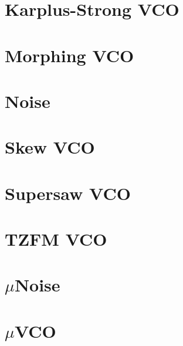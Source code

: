 \documentclass[11pt]{book}
\begin{document}
\section{Karplus-Strong VCO}
\pagebreak
\section{Morphing VCO}
\pagebreak
\section{Noise}
\pagebreak
\section{Skew VCO}
\pagebreak
\section{Supersaw VCO}
\pagebreak
\section{TZFM VCO}
\pagebreak
\section{$\mu$Noise}
\pagebreak
\section{$\mu$VCO}
\pagebreak
\end{document}
